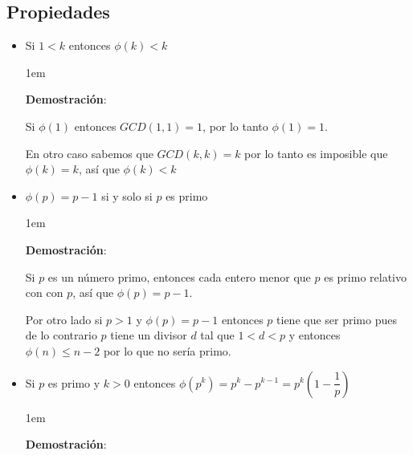 \documentclass[12pt, fleqn]{report}                             %
\newenvironment{SmallIndentation}[1][0.75em]                    %
    {\begin{adjustwidth}{#1}{}\begin{footnotesize}}                 %
    {\end{footnotesize}\end{adjustwidth}}                           %
\newcommand{\Wrap}[1]{\left( #1 \right)}                        %
\begin{document}
        \subsection{Propiedades}

            \begin{itemize}

                \item Si $1 < k$ entonces $\phi(k) < k$
                
                    \begin{SmallIndentation}[1em]
                        \textbf{Demostración}:

                        Si $\phi(1)$ entonces $GCD(1,1) = 1$, por lo tanto
                        $\phi(1)=1$.

                        En otro caso sabemos que $GCD(k, k) = k$ por lo tanto
                        es imposible que $\phi(k)=k$, así que $\phi(k) < k$

                    \end{SmallIndentation}


                \item $\phi(p) = p - 1$ si y solo si $p$ es primo

                    \begin{SmallIndentation}[1em]
                        \textbf{Demostración}:

                        Si $p$ es un número primo, entonces cada entero menor
                        que $p$ es primo relativo con con $p$, así que 
                        $\phi(p) = p-1$.

                        Por otro lado si $p > 1$ y $\phi(p) = p-1$ entonces $p$
                        tiene que ser primo pues de lo contrario $p$ tiene
                        un divisor $d$ tal que $1<d<p$ y entonces
                        $\phi(n) \leq n-2$ por lo que no sería primo.

                    \end{SmallIndentation}


                \item Si $p$ es primo y $k > 0$ entonces
                    $\phi(p^k) = p^k - p^{k-1} = p^k\Wrap{1 - \dfrac{1}{p}}$

                    \begin{SmallIndentation}[1em]
                        \textbf{Demostración}:


\end{SmallIndentation}
\end{itemize}
\end{document}
